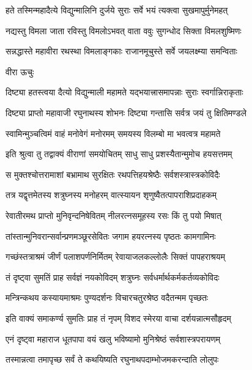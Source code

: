 \twolineshloka
{हते तस्मिन्महादैत्ये विद्युन्मालिनि दुर्जये}
{सुराः सर्वे भयं त्यक्त्वा सुखमापुर्मुनेमहत्}%

\twolineshloka
{नद्यस्तु विमला जाता रविस्तु विमलोऽभवत्}
{वाता ववुः सुगन्धोद सिक्ता विमलशुष्मिणः}%

\twolineshloka
{सन्नद्धास्ते महावीरा रथस्था विमलाङ्गकाः}
{राजानमूचुस्ते सर्वे जयलक्ष्म्या समन्विताः}%

वीरा ऊचुः

\twolineshloka
{दिष्ट्या हतस्त्वया दैत्यो विद्युन्माली महामते}
{यद्भयात्त्रासमापन्नाः सुराः स्वर्गान्निराकृताः}%

\twolineshloka
{दिष्ट्या प्राप्तो महावाजी रघुनाथस्य शोभनः}
{दिष्ट्या गन्तासि सर्वत्र जयं तु क्षितिमण्डले}%

\twolineshloka
{स्वामिन्मुञ्चत्विमं वाहं मनोवेगं मनोरमम्}
{समयस्य विलम्बो मा भवत्वत्र महामते}%


\twolineshloka
{इति श्रुत्वा तु तद्वाक्यं वीराणां समयोचितम्}
{साधु साधु प्रशस्यैतान्मुमोच हयसत्तमम्}%

\twolineshloka
{स मुक्तश्चोत्तरामाशां बभ्रामाथ सुरक्षितः}
{रथपत्तिहयश्रेष्ठैः सर्वशस्त्रास्त्रकोविदैः}%

\twolineshloka
{तत्र यद्वृत्तमेतस्य शत्रुघ्नस्य मनोहरम्}
{वात्स्यायन शृणुष्वैतत्पापराशिप्रदाहकम्}%

\twolineshloka
{रेवातीरमथ प्राप्तो मुनिवृन्दनिषेवितम्}
{नीलरत्नसमूहस्य रसः किं तु पयो मिषात्}%

\twolineshloka
{तांस्तान्मुनिवरान्सर्वान्प्रणमञ्छूरसेवितः}
{जगाम हयरत्नस्य पृष्ठतः कामगामिनः}%

\twolineshloka
{गच्छंस्तत्राश्रमं जीर्णं पलाशपर्णनिर्मितम्}
{रेवायाजलकल्लोलैः सिक्तं पापहराश्रयम्}%

\twolineshloka
{तं दृष्ट्वा सुमतिं प्राह सर्वज्ञं नयकोविदम्}
{शत्रुघ्नः सर्वधर्मार्थकर्मकर्तव्यकोविदः}%


\twolineshloka
{मन्त्रिन्कथय कस्यायमाश्रमः पुण्यदर्शनः}
{विचारचतुरश्रेष्ठ वदैतन्मम पृच्छतः}%


\twolineshloka
{इति वाक्यं समाकर्ण्य सुमतिः प्राह तं नृपम्}
{विशद स्मेरया वाचा दर्शयन्नात्मसौहृदम्}%


\twolineshloka
{एनं दृष्ट्वा महाराज धूतपापा वयं खलु}
{भविष्यामो मुनिश्रेष्ठं सर्वशास्त्रपरायणम्}%

\twolineshloka
{तस्मान्नत्वा तमापृच्छ सर्वं ते कथयिष्यति}
{रघुनाथपदाम्भोजमकरन्दाति लोलुपः}%

